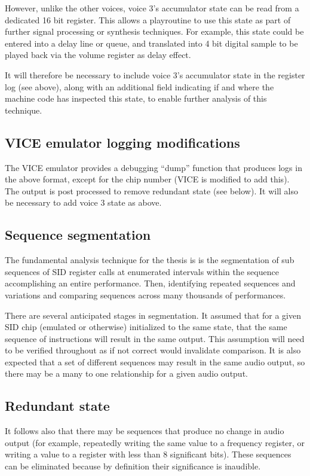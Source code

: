 \documentclass[10pt]{article}
\begin{document}
\begin{multicols*}{2}
  However, unlike the other voices, voice 3's accumulator state can be
  read from a dedicated 16 bit register. This allows a playroutine to use
  this state as part of further signal processing or synthesis
  techniques. For example, this state could be entered into a delay
  line or queue, and translated into 4 bit digital sample to be played
  back via the volume register as delay effect.

  It will therefore be necessary to include voice 3's accumulator
  state in the register log (see above), along with an additional
  field indicating if and where the machine code has inspected this
  state, to enable further analysis of this technique.

  \subsection{VICE emulator logging modifications}
  The VICE emulator provides a debugging ``dump'' function that
  produces logs in the above format, except for the chip number
  (VICE is modified to add this).  The output is post processed
  to remove redundant state (see below).  It will also be
  necessary to add voice 3 state as above.

  \subsection{Sequence segmentation}
  The fundamental analysis technique for the thesis is
  is the segmentation of sub sequences of SID register calls at
  enumerated intervals within the sequence accomplishing an entire
  performance. Then, identifying repeated sequences and variations and
  comparing sequences across many thousands of performances.

  There are several anticipated stages in segmentation. It assumed
  that for a given SID chip (emulated or otherwise) initialized to the
  same state, that the same sequence of instructions will result in
  the same output. This assumption will need to be verified throughout
  as if not correct would invalidate comparison. It is also expected
  that a set of different sequences may result in the same audio
  output, so there may be a many to one relationship for a given audio
  output.

  \subsection{Redundant state}
  It follows also that there may be sequences that produce no change
  in audio output (for example, repeatedly writing the same value to a
  frequency register, or writing a value to a register with less than
  8 significant bits). These sequences can be eliminated because by
  definition their significance is inaudible.


\end{multicols*}
\end{document}
